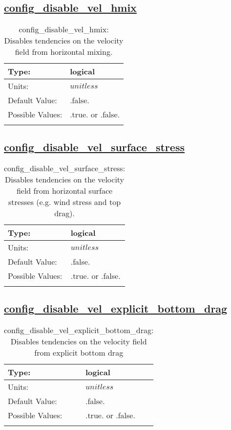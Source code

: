 \subsection[config\_disable\_vel\_hmix]{\hyperref[sec:nm_tab_debug]{config\_disable\_vel\_hmix}}
\label{subsec:nm_sec_config_disable_vel_hmix}
\begin{center}
\begin{longtable}{| p{2.0in} || p{4.0in} |}
    \hline
    Type: & logical \\
    \hline
    Units: & $unitless$ \\
    \hline
    Default Value: & .false. \\
    \hline
    Possible Values: & .true. or .false. \\
    \hline
    \caption{config\_disable\_vel\_hmix: Disables tendencies on the velocity field from horizontal mixing.}
\end{longtable}
\end{center}
\subsection[config\_disable\_vel\_surface\_stress]{\hyperref[sec:nm_tab_debug]{config\_disable\_vel\_surface\_stress}}
\label{subsec:nm_sec_config_disable_vel_surface_stress}
\begin{center}
\begin{longtable}{| p{2.0in} || p{4.0in} |}
    \hline
    Type: & logical \\
    \hline
    Units: & $unitless$ \\
    \hline
    Default Value: & .false. \\
    \hline
    Possible Values: & .true. or .false. \\
    \hline
    \caption{config\_disable\_vel\_surface\_stress: Disables tendencies on the velocity field from horizontal surface stresses (e.g. wind stress and top drag).}
\end{longtable}
\end{center}
\subsection[config\_disable\_vel\_explicit\_bottom\_drag]{\hyperref[sec:nm_tab_debug]{config\_disable\_vel\_explicit\_bottom\_drag}}
\label{subsec:nm_sec_config_disable_vel_explicit_bottom_drag}
\begin{center}
\begin{longtable}{| p{2.0in} || p{4.0in} |}
    \hline
    Type: & logical \\
    \hline
    Units: & $unitless$ \\
    \hline
    Default Value: & .false. \\
    \hline
    Possible Values: & .true. or .false. \\
    \hline
    \caption{config\_disable\_vel\_explicit\_bottom\_drag: Disables tendencies on the velocity field from explicit bottom drag}
\end{longtable}
\end{center}
